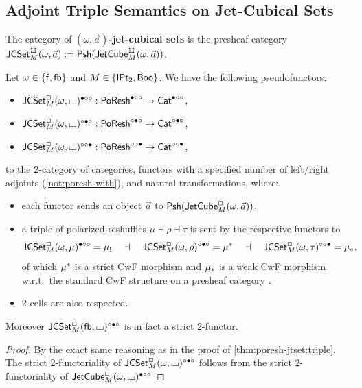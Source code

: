 \documentclass[a4paper]{memoir}
\begin{document}
\subsection{Adjoint Triple Semantics on Jet-Cubical Sets} \label{sec:poresh-jcset:triple}
\begin{definition}
	The category of \textbf{$(\omega, \vec a)$-jet-cubical sets} is the presheaf category $\jcset{\omega}{\mycubex}{M}{\vec a} := \Psh(\jetcube{\omega}{\mycubex}{M}{\vec a})$.
\end{definition}
\begin{theorem} \label{thm:poresh-jcset:triple}
	Let $\omega \in \mathopen{}\left\{ {\mathsf{f}}, {\mathsf{fb}} \right\}\mathclose{}$ and $M \in \mathopen{}\left\{ {\mathsf{IPt}_2}, \mathsf{Boo} \right\}\mathclose{}$.
	We have the following pseudofunctors:
	\begin{itemize}
		\item $\mathsf{JCSet}^{\Box}_{M}(\omega,{\llcorner\hspace{-.4ex}\lrcorner})^{\bullet \circ \circ} : \mathsf{PoResh}^{\bullet \circ \circ} \to {\mathsf{Cat}}^{\bullet \circ \circ}$,
		\item $\mathsf{JCSet}^{\Box}_{M}(\omega,{\llcorner\hspace{-.4ex}\lrcorner})^{\circ \bullet \circ} : \mathsf{PoResh}^{\circ \bullet \circ} \to {\mathsf{Cat}}^{\circ \bullet \circ}$,
		\item $\mathsf{JCSet}^{\Box}_{M}(\omega,{\llcorner\hspace{-.4ex}\lrcorner})^{\circ \circ \bullet} : \mathsf{PoResh}^{\circ \circ \bullet} \to {\mathsf{Cat}}^{\circ \circ \bullet}$,
	\end{itemize}
	to the 2-category of categories, functors with a specified number of left/right adjoints (\cref{not:poresh-with}), and natural transformations, where:
	\begin{itemize}
		\item each functor sends an object $\vec a$ to ${\mathsf{Psh}}(\mathsf{JetCube}^{\Box}_{M}(\omega,\vec a))$,
		\item a triple of polarized reshuffles $\mu \dashv \rho \dashv \tau$ is sent by the respective functors to
		\[
			\mathsf{JCSet}^{\Box}_{M}(\omega,\mu)^{\bullet \circ \circ} = {\mu}_!
			\quad\dashv\quad
			\mathsf{JCSet}^{\Box}_{M}(\omega,\rho)^{\circ \bullet \circ} = {\mu}^*
			\quad\dashv\quad
			\mathsf{JCSet}^{\Box}_{M}(\omega,\tau)^{\circ \circ \bullet} = {\mu}_*,
		\]
		of which ${\mu}^*$ is a strict CwF morphism \cite{dybjer-cwf} and ${\mu}_*$ is a weak CwF morphism \cite[def.\ 2.1.1]{reldtt-techreport}\cite[def.\ 3.2.5]{nuyts-phd} w.r.t.\ the standard CwF structure on a presheaf category \cite[ch.\ 4]{Hofmann97}\cite[\S 4.1]{nuyts-phd}.
		\item 2-cells are also respected.
	\end{itemize}
	Moreover $\mathsf{JCSet}^{\Box}_{M}({\mathsf{fb}},{\llcorner\hspace{-.4ex}\lrcorner})^{\circ \bullet \circ}$ is in fact a strict 2-functor.
\end{theorem}
\begin{proof}
	By the exact same reasoning as in the proof of \cref{thm:poresh-jtset:triple}.
	The strict 2-functoriality of $\mathsf{JCSet}^{\Box}_{M}(\omega,{\llcorner\hspace{-.4ex}\lrcorner})^{\circ \bullet \circ}$ follows from the strict 2-functoriality of $\mathsf{JetCube}^{\Box}_{M}(\omega,{\llcorner\hspace{-.4ex}\lrcorner})^{\bullet \circ \circ}$
\end{proof}
\end{document}
